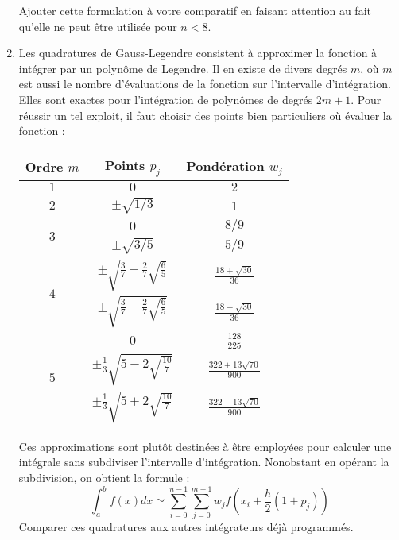 \begin{enumerate}
 Ajouter cette formulation à votre  comparatif en faisant attention au fait
 qu'elle ne peut être utilisée pour $n<8$.
\item  Les quadratures  de Gauss-Legendre  consistent à  approximer la
  fonction à  intégrer par un  polynôme de  Legendre. Il en  existe de
  divers degrés  $m$, où $m$  est aussi  le nombre d'évaluations  de la
  fonction sur  l'intervalle d'intégration.   Elles sont  exactes pour
  l'intégration de  polynômes de  degrés $2m+1$.  Pour réussir  un tel
  exploit, il faut choisir des  points bien particuliers où évaluer la
  fonction :
\begin{center}
\begin{tabular}{ccc}
Ordre $m$& Points $p_j$ &Pondération $w_j$\\
\hline\hline
\strut$1$ & $0$ & $2$ \\\hline
\strut$2$ & $\pm \sqrt{1/3}$ & 1\\\hline
\multirow{2}{*}{$3$} &  $0$              & $8/9$\\
                     & $\pm\sqrt{3/5}$   & $5/9$\\\hline
\multirow{2}{*}{$4$} &  $\pm\sqrt{\frac{3}{7}-\frac{2}{7}\sqrt{\frac{6}{5}}}$              & $\frac{18+\sqrt{30}}{36}$\\
                     &  $\pm\sqrt{\frac{3}{7}+\frac{2}{7}\sqrt{\frac{6}{5}}}$              & $\frac{18-\sqrt{30}}{36}$\\\hline
\multirow{3}{*}{$5$} & $0$ & $\frac{128}{225}$\\
                     &  $\pm\frac{1}{3}\sqrt{5-2\sqrt{\frac{10}{7}}}$ & $\frac{322+13\sqrt{70}}{900}$\\
                     &  $\pm\frac{1}{3}\sqrt{5+2\sqrt{\frac{10}{7}}}$ & $\frac{322-13\sqrt{70}}{900}$\\

\end{tabular}
\end{center}
Ces  approximations  sont  plutôt  destinées  à  être  employées  pour
calculer     une     intégrale    sans     subdiviser     l'intervalle
d'intégration.  Nonobstant en  opérant  la subdivision,  on obtient  la
formule :
\begin{equation}
\int_a^b   f(x)dx   \simeq   \sum_{i=0}^{n-1}   \sum_{j=0}^{m-1}   w_j
f(x_i+\frac{h}{2}(1+p_j))
\end{equation}
Comparer  ces  quadratures  aux autres  intégrateurs  déjà  programmés.\\





\end{enumerate}
